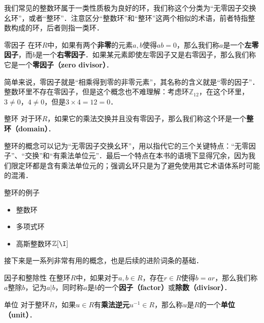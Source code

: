 


我们常见的整数环属于一类性质极为良好的环，我们称这个分类为“无零因子交换幺环”，或者“整环”．注意区分“整数环”和“整环”这两个相似的术语，前者特指整数构成的环，后者则指一类环．

\begin{definition}{零因子}
在环$R$中，如果有两个\textbf{非零}的元素$a, b$使得$ab=0$，那么我们称$a$是一个\textbf{左零因子}，而$b$是一个\textbf{右零因子}．如果某元素即使左零因子又是右零因子，那么我们称它是一个\textbf{零因子（zero divisor）}．
\end{definition}

简单来说，零因子就是“相乘得到零的非零元素”，其名称的含义就是“零的因子”．整数环里不存在零因子，但是这个概念也不难理解：考虑环$\mathbb{Z}_{12}$，在这个环里，$3\not=0$，$4\not=0$，但是$3\times 4=12=0$．

\begin{definition}{整环}
对于环$R$，如果它的乘法交换并且没有零因子，那么我们称这个环是一个\textbf{整环（domain）}．
\end{definition}

整环的概念可以记为“无零因子交换幺环”，用以指代它的三个关键特点：“无零因子”、“交换”和“有乘法单位元”．最后一个特点在本书的语境下显得冗余，因为我们限定环都是含有乘法单位元的；强调幺环只是为了避免使用其它术语体系时可能的混淆．

\begin{example}{整环的例子}
\begin{itemize}
\item 整数环
\item 多项式环
\item 高斯整数环$\mathbb{Z}[\I]$
\end{itemize}

\end{example}

接下来是一系列非常有用的概念，也是后续的进阶词条的基础．

\begin{definition}{因子和整除性}
在整环$R$中，如果对于$a, b\in R$，存在$r\in R$使得$b=ar$，那么我们称$a$整除$b$，记为$a|b$，同时称$a$是$b$的一个\textbf{因子（factor）}或\textbf{除数（divisor）}．
\end{definition}

\begin{definition}{单位}
对于整环$R$，如果$u\in R$有\textbf{乘法逆元}$u^{-1}\in R$，那么称$u$是$R$的一个\textbf{单位（unit）}．
\end{definition}

